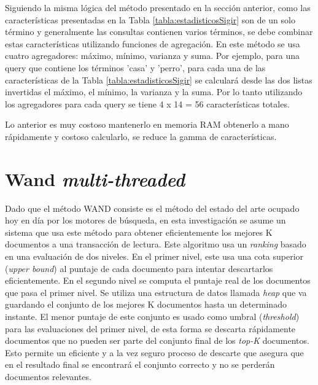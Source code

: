 Siguiendo la misma lógica del método presentado en la sección anterior, como las características presentadas en la Tabla \ref{tabla:estadisticosSigir} son de un solo término y generalmente las consultas contienen varios términos, se debe combinar estas características utilizando funciones de agregación. En este método se usa cuatro agregadores: máximo, mínimo, varianza y suma. Por ejemplo, para una query que contiene los términos 'casa' y 'perro', para cada una de las características de la Tabla \ref{tabla:estadisticosSigir} se calculará desde las dos listas invertidas el máximo, el mínimo, la varianza y la suma. Por lo tanto utilizando los agregadores para cada query se tiene 4 x 14 = 56 características totales.

Lo anterior es muy costoso mantenerlo en memoria RAM  obtenerlo a mano rápidamente y costoso calcularlo, se reduce la gamma de características.







\section{Wand \textit{multi-threaded}}
\label{scheduling:wm}
Dado que el método WAND \citep{Broder:2003} consiste es el método del estado del arte ocupado hoy en día por los motores de búsqueda, en esta investigación se asume un sistema que usa este método para obtener eficientemente los mejores K documentos a una transacción de lectura. Este algoritmo usa un \textit{ranking} basado en una evaluación de dos niveles. En el primer nivel, este usa una cota superior (\textit{upper bound}) al puntaje de cada documento para intentar descartarlos eficientemente. En el segundo nivel se computa el puntaje real de los documentos que pasa el primer nivel. Se utiliza una estructura de datos llamada \textit{heap} que va guardando el conjunto de los mejores K documentos hasta un determinado instante. El menor puntaje de este conjunto es usado como umbral (\textit{threshold}) para las evaluaciones del primer nivel, de esta forma se descarta rápidamente documentos que no pueden ser parte del conjunto final de los \textit{top-K} documentos. Esto permite un eficiente y a la vez seguro proceso de descarte que asegura que en el resultado final se encontrará el conjunto correcto y no se perderán documentos relevantes.

